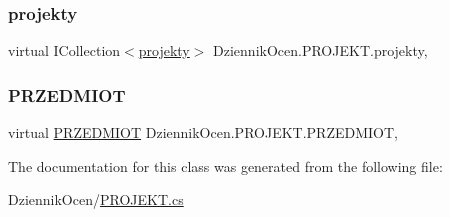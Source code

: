 \subsubsection{\texorpdfstring{projekty}{projekty}}
{\footnotesize\ttfamily virtual I\+Collection$<$\hyperlink{class_dziennik_ocen_1_1projekty}{projekty}$>$ Dziennik\+Ocen.\+P\+R\+O\+J\+E\+K\+T.\+projekty\hspace{0.3cm}{\ttfamily [get]}, {\ttfamily [set]}}

\mbox{\label{class_dziennik_ocen_1_1_p_r_o_j_e_k_t_a4ed65111634cf5bde9380fbfb01a6078}} 
\subsubsection{\texorpdfstring{P\+R\+Z\+E\+D\+M\+I\+OT}{PRZEDMIOT}}
{\footnotesize\ttfamily virtual \hyperlink{class_dziennik_ocen_1_1_p_r_z_e_d_m_i_o_t}{P\+R\+Z\+E\+D\+M\+I\+OT} Dziennik\+Ocen.\+P\+R\+O\+J\+E\+K\+T.\+P\+R\+Z\+E\+D\+M\+I\+OT\hspace{0.3cm}{\ttfamily [get]}, {\ttfamily [set]}}



The documentation for this class was generated from the following file\+:\begin{DoxyCompactItemize}
\item 
Dziennik\+Ocen/\hyperlink{_p_r_o_j_e_k_t_8cs}{P\+R\+O\+J\+E\+K\+T.\+cs}\end{DoxyCompactItemize}
